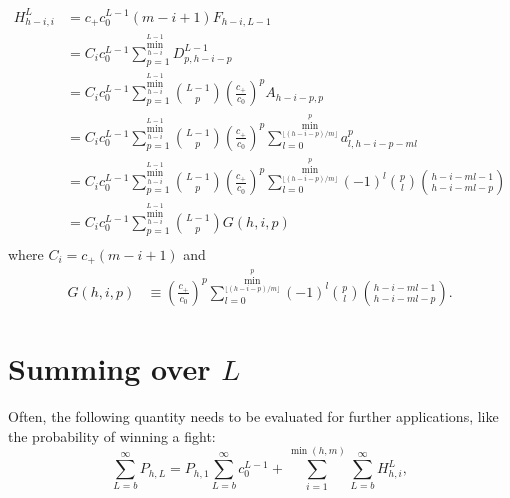 	\begin{align}
		H_{h-i, i}^L &= c_+c_0^{L-1} (m - i + 1)F_{h-i, L-1}\\
		&= C_ic_0^{L-1} \sum_{p=1}^{\min_{h-i}^{L-1}} D_{p, h-i-p}^{L-1}\\
		&= C_ic_0^{L-1} \sum_{p=1}^{\min_{h-i}^{L-1}} {L-1 \choose p}  \left(\frac{c_+}{c_0}\right)^p  A_{h-i-p, p}\\
		&= C_ic_0^{L-1} \sum_{p=1}^{\min_{h-i}^{L-1}} {L-1 \choose p}  \left(\frac{c_+}{c_0}\right)^p  \sum_{l=0}^{\min_{\lfloor (h-i-p) / m \rfloor}^{p}} a_{l, h-i-p-ml}^p\\
		&= C_ic_0^{L-1} \sum_{p=1}^{\min_{h-i}^{L-1}} {L-1 \choose p}  \left(\frac{c_+}{c_0}\right)^p  \sum_{l=0}^{\min_{\lfloor (h-i-p) / m \rfloor}^{p}} (-1)^l  {p \choose l} {h-i-ml-1\choose h-i-ml-p}\\
		&= C_i c_0^{L-1}\sum_{p=1}^{\min_{h-i}^{L-1}} {L-1 \choose p}  G(h, i, p)\\
	\end{align}
	where $C_i = c_+(m - i + 1)$ and 
	\begin{align}
		G(h, i, p) &\equiv \left(\frac{c_+}{c_0}\right)^p  \sum_{l=0}^{\min_{\lfloor (h-i-p) / m \rfloor}^{p}} (-1)^l  {p \choose l} {h-i-ml-1\choose h-i-ml-p}.
	\end{align}


	\section{Summing over $L$}
		Often, the following quantity needs to be evaluated for further applications, like the probability of winning a fight:
		\begin{equation}
			\sum_{L=b}^\infty P_{h, L} = P_{h, 1}\sum_{L=b}^\infty c_0^{L-1}  + \sum_{i=1}^{\min(h, m)} \sum_{L=b}^\infty H_{h, i}^L,
		\end{equation}
		

